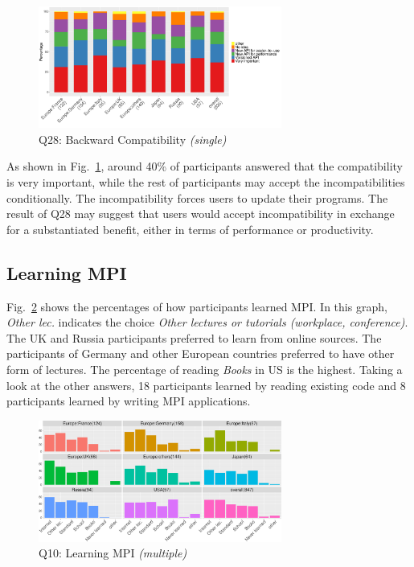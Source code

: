 \documentclass[preprint,5p,times]{elsarticle}
\def\myquote#1{{\it #1}}
\newcommand{\revision}[2]{{\color{blue}#2}}
\begin{document}
\begin{figure}[tb]
\begin{center}
\includegraphics[width=8.0cm]{R-scripts/Q28.pdf}
\caption{Q28: Backward Compatibility {\it(single)}}
\label{fig:compatibility}
\vspace{-3mm}%
\end{center}
\end{figure}

As shown in Fig.~\ref{fig:compatibility}, around 40\% of participants answered
that the compatibility is very important, while the rest of participants may
accept the \revision{incompatibility}{incompatibilities} conditionally. The incompatibility forces users to
update their programs. The result of Q28 may \revision{suggests}{suggest} that users would accept
incompatibility in exchange \revision{of}{for} a substantiated benefit, either in terms of
performance or productivity.

\subsection{Learning MPI}\label{sec:learning-mpi}

Fig.~\ref{fig:learning-mpi} shows the percentages of how participants learned
MPI. In this graph, \myquote{Other lec.} indicates the choice \myquote{Other
lectures or tutorials (workplace, conference)}. The UK and Russia participants
preferred to learn from online sources. The participants of Germany and other
European countries preferred to have other form of lectures. The percentage of
reading \myquote{Books} in US is the highest. Taking a look at the other
answers, 18 participants learned by reading existing code and 8 participants
learned by writing MPI applications.

\begin{figure}[tb]
\begin{center}
\includegraphics[width=8.0cm]{R-scripts/Q10.pdf}
\caption{Q10: Learning MPI {\it(multiple)}}
\label{fig:learning-mpi}
\vspace{-3mm}%
\end{center}
\end{figure}
\end{document}
